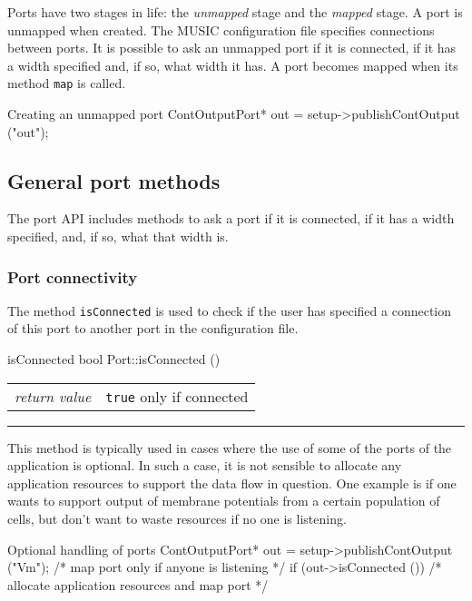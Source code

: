 \documentclass[a4paper,twoside]{report}
\makeatletter
\newenvironment{parameters}%
{\begin{tabular}{@{\hspace{2em}}lp{0.6\textwidth}}}%
{\end{tabular}\par\vspace{1mm}\par\hrule\par\vspace{5mm}}
\makeatother
\begin{document}
Ports have two stages in life: the \emph{unmapped} stage and the
\emph{mapped} stage.  A port is unmapped when created.  The MUSIC
configuration file specifies connections between ports.  It is
possible to ask an unmapped port if it is connected, if it has a width
specified and, if so, what width it has.  A port becomes mapped when
its method \lstinline|map| is called.

\begin{code}{Creating an unmapped port}
ContOutputPort* out =
   setup->publishContOutput ("out");
\end{code}

\subsection{General port methods}

The port API includes methods to ask a port if it is connected, if it
has a width specified, and, if so, what that width is.

\subsubsection{Port connectivity}

The method \lstinline|isConnected| is used to check if the user has
specified a connection of this port to another port in the
configuration file.

\begin{head}{isConnected}
  bool Port::isConnected ()
\end{head}
\begin{parameters}
  \emph{return value} & \lstinline|true| only if connected\\
\end{parameters}

This method is typically used in cases where the use of some of the
ports of the application is optional.  In such a case, it is not
sensible to allocate any application resources to support the data
flow in question.  One example is if one wants to support output of
membrane potentials from a certain population of cells, but don't want
to waste resources if no one is listening.

\begin{code}{Optional handling of ports}
ContOutputPort* out =
   setup->publishContOutput ("Vm");
/* map port only if anyone is listening */
if (out->isConnected ())
  /* allocate application resources and map port */
\end{code}
\end{document}
